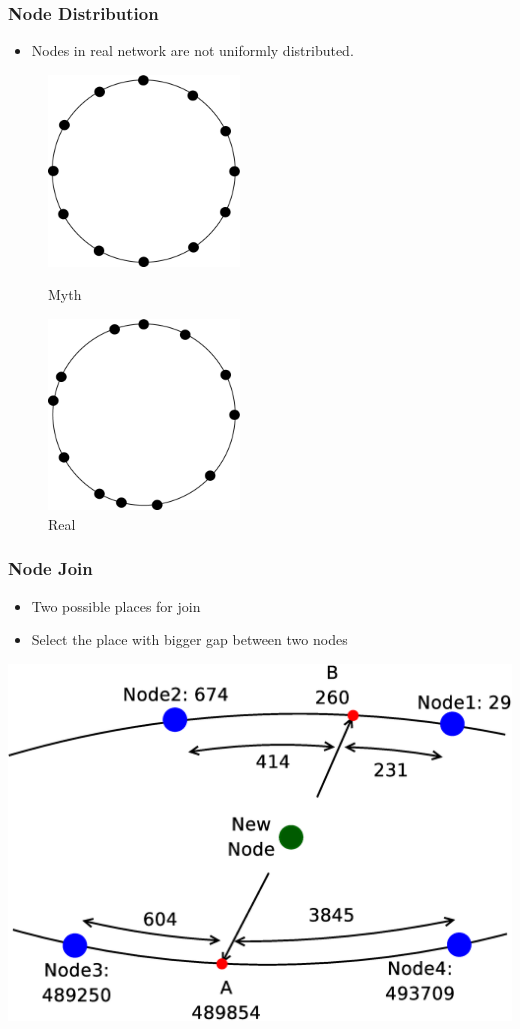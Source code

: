 \documentclass[red]{beamer}
\begin{document}
\begin{frame}
\frametitle{Node Distribution}
\begin{itemize}
\item Nodes in real network are not uniformly distributed. 
\end{itemize}
\begin{figure}
\begin{minipage}{5cm}
\centering
\includegraphics[width=2.0in]{figs/myth}
\caption{Myth} 
\end{minipage}
\begin{minipage}{5cm}
\centering
\includegraphics[width=2.0in]{figs/real}
\caption{Real}
\end{minipage}
\end{figure}

\end{frame}
\begin{frame}
\frametitle{Node Join}
\begin{itemize}
\item Two possible places for join 
\item Select the place with bigger gap between two nodes
\end{itemize}
\center
\includegraphics[angle=0,scale=0.2]{figs/evenNet}

\end{frame}
\end{document}
